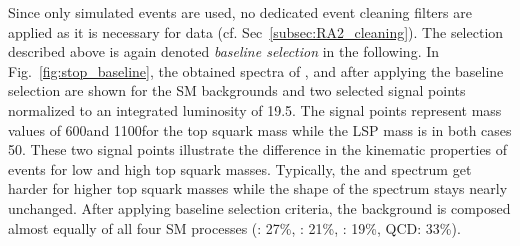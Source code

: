 Since only simulated events are used, no dedicated event cleaning filters are applied as it is necessary for data (cf. Sec~\ref{subsec:RA2_cleaning}). The selection described above is again denoted \textit{baseline selection} in the following. In Fig.~\ref{fig:stop_baseline}, the obtained spectra of \HT, \met and \NJets after applying the baseline selection are shown for the SM backgrounds and two selected signal points normalized to an integrated luminosity of 19.5\fbinv. The signal points represent mass values of 600\gev and 1100\gev for the top squark mass while the LSP mass is in both cases 50\gev. These two signal points illustrate the difference in the kinematic properties of events for low and high top squark masses. Typically, the \HT and \met spectrum get harder for higher top squark masses while the shape of the \NJets spectrum stays nearly unchanged. After applying baseline selection criteria, the background is composed almost equally of all four SM processes (\ttbar: 27\%, \WJets: 21\%, \ZJets: 19\%, QCD: 33\%).
